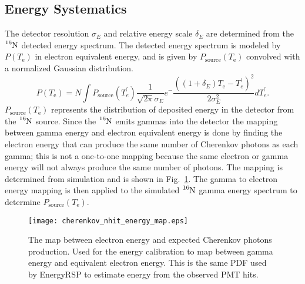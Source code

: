 \subsection{Energy Systematics}
The detector resolution $\sigma_{E}$ and relative energy scale $\delta_{E}$ are determined
from the $\ce{^{16}N}$ detected energy spectrum.
The detected energy spectrum is modeled by $P(T_\mathrm{e})$ in electron equivalent
energy, and is given by $P_{\mathrm{source}}(T_{\mathrm{e}})$
convolved with a normalized Gaussian distribution.
\begin{equation}
    P(T_\mathrm{e}) = N \int P_\mathrm{source}(T^{\prime}_{e})\frac{1}{\sqrt{2\pi}\sigma_{E}}e^-{\frac{\left((1+\delta_E)T_\mathrm{e}-T^{\prime}_{e}\right)^{2}}{2\sigma^{2}_{E}}}dT^{\prime}_{e}\text{.}%
\label{eq:convolution}
\end{equation}
$P_\mathrm{source}(T_{\mathrm{e}})$ represents the distribution of deposited energy in
the detector from the $\ce{^{16}N}$ source.
Since the $\ce{^{16}N}$ emits gammas into the detector the mapping between
gamma energy and electron equivalent energy is done by finding the electron
energy that can produce the same number of Cherenkov photons
as each gamma; this is not a one-to-one mapping because the same electron or gamma
energy will not always produce the same number of photons.
The mapping is determined from simulation and is shown in
Fig.~\ref{fig:cherenkov_energy_map}.
The gamma to electron energy mapping is then applied to the simulated $\ce{^{16}N}$
gamma energy spectrum to determine $P_\mathrm{source}(T_{\mathrm{e}})$.

\begin{figure}[htbp]
\centering
\texttt{[image: cherenkov\_nhit\_energy\_map.eps]}
\caption[Electron Cherenkov Photon Product PDF]{ The map between electron
energy and expected Cherenkov photons production.  Used for the energy
calibration to map between gamma energy and equivalent electron energy.  This is
the same PDF used by EnergyRSP to estimate energy from the observed PMT hits.}
\label{fig:cherenkov_energy_map}
\end{figure}

